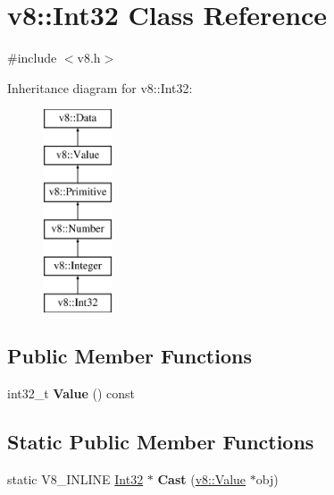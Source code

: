 \hypertarget{classv8_1_1_int32}{}\section{v8\+:\+:Int32 Class Reference}
\label{classv8_1_1_int32}


{\ttfamily \#include $<$v8.\+h$>$}

Inheritance diagram for v8\+:\+:Int32\+:\begin{figure}[H]
\begin{center}
\leavevmode
\includegraphics[height=6.000000cm]{classv8_1_1_int32}
\end{center}
\end{figure}
\subsection*{Public Member Functions}
\begin{DoxyCompactItemize}
\item 
int32\+\_\+t {\bfseries Value} () const \hypertarget{classv8_1_1_int32_a74860c6a524e1fb3f7b685ab0896be4b}{}\label{classv8_1_1_int32_a74860c6a524e1fb3f7b685ab0896be4b}

\end{DoxyCompactItemize}
\subsection*{Static Public Member Functions}
\begin{DoxyCompactItemize}
\item 
static V8\+\_\+\+I\+N\+L\+I\+NE \hyperlink{classv8_1_1_int32}{Int32} $\ast$ {\bfseries Cast} (\hyperlink{classv8_1_1_value}{v8\+::\+Value} $\ast$obj)\hypertarget{classv8_1_1_int32_a910c59c30a7f5f3c96afd0ba10d5339b}{}\label{classv8_1_1_int32_a910c59c30a7f5f3c96afd0ba10d5339b}

\end{DoxyCompactItemize}
